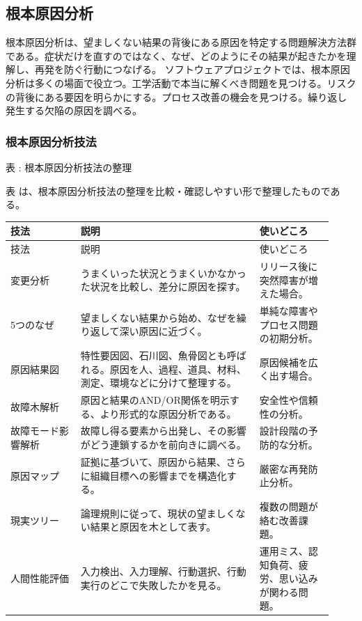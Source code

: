 \subsection{根本原因分析}
根本原因分析は、望ましくない結果の背後にある原因を特定する問題解決方法群である。症状だけを直すのではなく、なぜ、どのようにその結果が起きたかを理解し、再発を防ぐ行動につなげる。
ソフトウェアプロジェクトでは、根本原因分析は多くの場面で役立つ。工学活動で本当に解くべき問題を見つける。リスクの背後にある要因を明らかにする。プロセス改善の機会を見つける。繰り返し発生する欠陥の原因を調べる。
\subsubsection{根本原因分析技法}
\par\smallskip\noindent{}\label{tab:ch18-12}表 \thetable: 根本原因分析技法の整理\par\smallskip
表 \thetable は、根本原因分析技法の整理を比較・確認しやすい形で整理したものである。\par\smallskip
\begin{longtable}{>{\raggedright\arraybackslash}p{0.20\linewidth}>{\raggedright\arraybackslash}p{0.51\linewidth}>{\raggedright\arraybackslash}p{0.21\linewidth}}
\toprule
技法 & 説明 & 使いどころ \\
\midrule
\endfirsthead
\toprule
技法 & 説明 & 使いどころ \\
\midrule
\endhead
変更分析 & うまくいった状況とうまくいかなかった状況を比較し、差分に原因を探す。 & リリース後に突然障害が増えた場合。 \\
5つのなぜ & 望ましくない結果から始め、なぜを繰り返して深い原因に近づく。 & 単純な障害やプロセス問題の初期分析。 \\
原因結果図 & 特性要因図、石川図、魚骨図とも呼ばれる。原因を人、過程、道具、材料、測定、環境などに分けて整理する。 & 原因候補を広く出す場合。 \\
故障木解析 & 原因と結果のAND/OR関係を明示する、より形式的な原因分析である。 & 安全性や信頼性の分析。 \\
故障モード影響解析 & 故障し得る要素から出発し、その影響がどう連鎖するかを前向きに調べる。 & 設計段階の予防的な分析。 \\
原因マップ & 証拠に基づいて、原因から結果、さらに組織目標への影響までを構造化する。 & 厳密な再発防止分析。 \\
現実ツリー & 論理規則に従って、現状の望ましくない結果と原因を木として表す。 & 複数の問題が絡む改善課題。 \\
人間性能評価 & 入力検出、入力理解、行動選択、行動実行のどこで失敗したかを見る。 & 運用ミス、認知負荷、疲労、思い込みが関わる問題。 \\
\bottomrule
\end{longtable}
